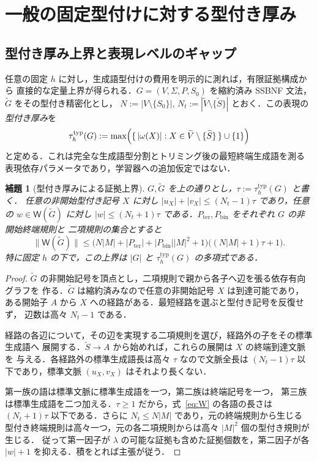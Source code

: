\documentclass[11pt,a4paper]{ltjsarticle}
\newtheorem{lemma}[theorem]{補題}
\theoremstyle{remark}
\theoremstyle{plain}
\newcommand{\WitnessSet}{\mathsf{W}}
\begin{document}
\section{一般の固定型付けに対する型付き厚み}
\label{sec:typed-thickness}

\subsection{型付き厚み上界と表現レベルのギャップ}

任意の固定 $h$ に対し，生成語型付けの費用を明示的に測れば，有限証拠構成から
直接的な定量上界が得られる．$G=(V,\Sigma,P,S_0)$ を縮約済み SSBNF 文法，
$\widetilde G$ をその型付き精密化とし，
$N:=|V\setminus\{S_0\}|$,
$N_t:=|\widetilde V\setminus\{\widetilde S\}|$
とおく．この表現の \emph{型付き厚み}を
\[
 \tau_h^{\mathrm{typ}}(G):=
 \max\Bigl(\{\,|\omega(X)|:
 X\in\widetilde V\setminus\{\widetilde S\}\,\}\cup\{1\}\Bigr)
\]
と定める．これは完全な生成語型分割とトリミング後の最短終端生成語を測る
表現依存パラメータであり，学習器への追加仮定ではない．

\begin{lemma}[型付き厚みによる証拠上界]
\label{lem:typed-thickness-bound}
$G,\widetilde G$ を上の通りとし，$\tau:=\tau_h^{\mathrm{typ}}(G)$ と書く．
任意の非開始型付き記号 $X$ に対し
$|u_X|+|v_X|\le (N_t-1)\tau$
であり，任意の $w\in\WitnessSet(\widetilde G)$ に対し
$|w|\le (N_t+1)\tau$
である．$P_{\mathrm{ter}},P_{\mathrm{bin}}$ をそれぞれ $G$ の非開始終端規則と
二項規則の集合とすると
\[
 \|\WitnessSet(\widetilde G)\|
 \le
 \bigl(N|M|+|P_{\mathrm{ter}}|
       +|P_{\mathrm{bin}}||M|^2+1\bigr)
 \bigl((N|M|+1)\tau+1\bigr).
\]
特に固定 $h$ の下で，この上界は $|G|$ と
$\tau_h^{\mathrm{typ}}(G)$ の多項式である．
\end{lemma}

\begin{proof}
$\widetilde G$ の非開始記号を頂点とし，二項規則で親から各子へ辺を張る依存有向グラフを
作る．$\widetilde G$ は縮約済みなので任意の非開始記号 $X$ は到達可能であり，
ある開始子 $A$ から $X$ への経路がある．最短経路を選ぶと型付き記号を反復せず，
辺数は高々 $N_t-1$ である．

経路の各辺について，その辺を実現する二項規則を選び，経路外の子をその標準生成語へ
展開する．$\widetilde S\to A$ から始めれば，これらの展開は $X$ の終端到達文脈を
与える．各経路外の標準生成語長は高々 $\tau$ なので文脈全長は
$(N_t-1)\tau$ 以下であり，標準文脈 $(u_X,v_X)$ はそれより長くない．

第一族の語は標準文脈に標準生成語を一つ，第二族は終端記号を一つ，
第三族は標準生成語を二つ加える．$\tau\ge1$ だから，式~\eqref{eq:W} の各語の長さは
$(N_t+1)\tau$ 以下である．さらに $N_t\le N|M|$ であり，元の終端規則から生じる
型付き終端規則は高々一つ，元の各二項規則からは高々 $|M|^2$ 個の型付き規則が生じる．
従って第一因子が $\lambda$ の可能な証拠も含めた証拠個数を，第二因子が各
$|w|+1$ を抑える．積をとれば主張が従う．
\end{proof}
\end{document}
